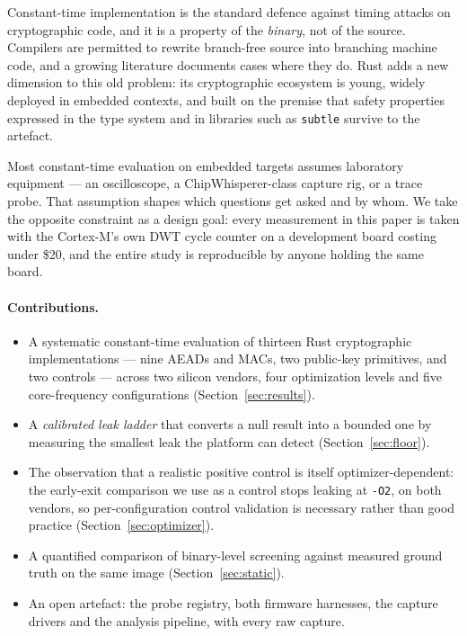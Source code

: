 \documentclass[11pt,a4paper]{article}
\begin{document}
Constant-time implementation is the standard defence against timing attacks on
cryptographic code, and it is a property of the \emph{binary}, not of the
source. Compilers are permitted to rewrite branch-free source into branching
machine code, and a growing literature documents cases where they do. Rust adds
a new dimension to this old problem: its cryptographic ecosystem is young,
widely deployed in embedded contexts, and built on the premise that safety
properties expressed in the type system and in libraries such as \texttt{subtle}
survive to the artefact.

Most constant-time evaluation on embedded targets assumes laboratory equipment
--- an oscilloscope, a ChipWhisperer-class capture rig, or a trace probe. That
assumption shapes which questions get asked and by whom. We take the opposite
constraint as a design goal: every measurement in this paper is taken with the
Cortex-M's own DWT cycle counter on a development board costing under
\$20, and the entire study is reproducible by anyone holding the same board.

\paragraph{Contributions.}
\begin{itemize}
  \item A systematic constant-time evaluation of thirteen Rust cryptographic
        implementations --- nine AEADs and MACs, two public-key primitives, and
        two controls --- across two silicon vendors, four optimization levels
        and five core-frequency configurations (Section~\ref{sec:results}).
  \item A \emph{calibrated leak ladder} that converts a null result into a
        bounded one by measuring the smallest leak the platform can detect
        (Section~\ref{sec:floor}).
  \item The observation that a realistic positive control is itself
        optimizer-dependent: the early-exit comparison we use as a control stops
        leaking at \texttt{-O2}, on both vendors, so per-configuration control
        validation is necessary rather than good practice
        (Section~\ref{sec:optimizer}).
  \item A quantified comparison of binary-level screening against measured
        ground truth on the same image (Section~\ref{sec:static}).
  \item An open artefact: the probe registry, both firmware harnesses, the
        capture drivers and the analysis pipeline, with every raw capture.
\end{itemize}
\end{document}
